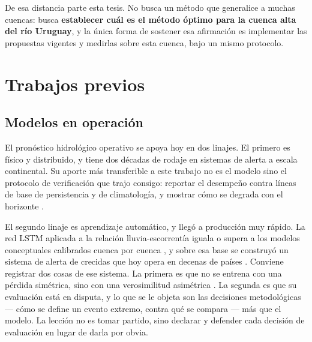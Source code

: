 De esa distancia parte esta tesis.
No busca un método que generalice a muchas cuencas: busca \textbf{establecer cuál es el método óptimo
para la cuenca alta del río Uruguay}, y la única forma de sostener esa afirmación es implementar
las propuestas vigentes y medirlas sobre esta cuenca, bajo un mismo protocolo.


\section{Trabajos previos}

%

\subsection{Modelos en operación}

El pronóstico hidrológico operativo se apoya hoy en dos linajes.
El primero es físico y distribuido, y tiene dos décadas de rodaje en sistemas de alerta a escala
continental.
Su aporte más transferible a este trabajo no es el modelo sino el protocolo de verificación que
trajo consigo: reportar el desempeño contra líneas de base de persistencia y de climatología, y
mostrar cómo se degrada con el horizonte \cite{harrigan-2023-glofas-reforecast}.

El segundo linaje es aprendizaje automático, y llegó a producción muy rápido.
La red LSTM aplicada a la relación lluvia-escorrentía iguala o supera a los modelos conceptuales
calibrados cuenca por cuenca \cite{kratzert-2018-lstm-lluvia-escorrentia}, y sobre esa base se
construyó un sistema de alerta de crecidas que hoy opera en decenas de países
\cite{nearing-2024-global-extreme-floods}.
Conviene registrar dos cosas de ese sistema.
La primera es que no se entrena con una pérdida simétrica, sino con una verosimilitud asimétrica
\cite{klotz-2022-uncertainty-deep-learning-rainfall-runoff}.
La segunda es que su evaluación está en disputa, y lo que se le objeta son las decisiones
metodológicas --- cómo se define un evento extremo, contra qué se compara --- más que el modelo.
La lección no es tomar partido, sino declarar y defender cada decisión de evaluación en lugar de
darla por obvia.

